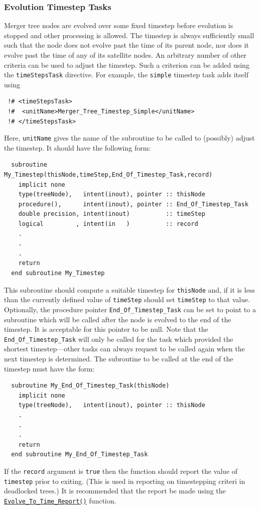 \subsubsection{Evolution Timestep Tasks}

Merger tree nodes are evolved over some fixed timestep before evolution is stopped and other processing is allowed. The timestep is always sufficiently small such that the node does not evolve past the time of its parent node, nor does it evolve past the time of any of its satellite nodes. An arbitrary number of other criteria can be used to adjust the timestep. Such a criterion can be added using the {\tt timeStepsTask} directive. For example, the {\tt simple} timestep task adds itself using
\begin{verbatim}
 !# <timeStepsTask>
 !#  <unitName>Merger_Tree_Timestep_Simple</unitName>
 !# </timeStepsTask>
\end{verbatim}
Here, {\tt unitName} gives the name of the subroutine to be called to (possibly) adjust the timestep. It should have the following form:
\begin{verbatim}
  subroutine My_Timestep(thisNode,timeStep,End_Of_Timestep_Task,record)
    implicit none
    type(treeNode),   intent(inout), pointer :: thisNode
    procedure(),      intent(inout), pointer :: End_Of_Timestep_Task
    double precision, intent(inout)          :: timeStep
    logical         , intent(in   )          :: record
    .
    .
    .
    return
  end subroutine My_Timestep
\end{verbatim}
This subroutine should compute a suitable timestep for {\tt thisNode} and, if it is less than the currently defined value of {\tt timeStep} should set {\tt timeStep} to that value. Optionally, the procedure pointer {\tt End\_Of\_Timestep\_Task} can be set to point to a subroutine which will be called after the node is evolved to the end of the timestep. It is acceptable for this pointer to be null. Note that the {\tt End\_Of\_Timestep\_Task} will only be called for the task which provided the shortest timestep---other tasks can always request to be called again when the next timestep is determined. The subroutine to be called at the end of the timestep must have the form:
\begin{verbatim}
  subroutine My_End_Of_Timestep_Task(thisNode)
    implicit none
    type(treeNode),   intent(inout), pointer :: thisNode
    .
    .
    .
    return
  end subroutine My_End_Of_Timestep_Task
\end{verbatim}
If the {\tt record} argument is {\tt true} then the function should report the value of {\tt timestep} prior to exiting. (This is used in reporting on timestepping criteri in deadlocked trees.) It is recommended that the report be made using the \hyperlink{merger_trees.evolve.timesteps.report.F90:evolve_to_time_reports:evolve_to_time_report}{\tt Evolve\_To\_Time\_Report()} function.

